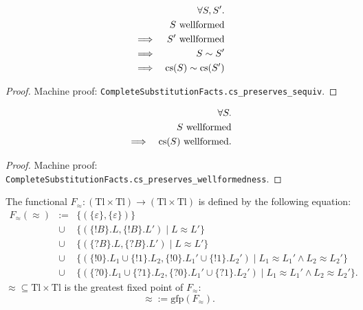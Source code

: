 \documentclass{llncs}
\newcommand*{\Tl}{\mathrm{Tl}}
\newcommand*{\gfp}{\mathrm{gfp}}
\newcommand*{\bisim}{\approx}
\newcommand*{\cs}{\mathrm{cs}}
\newcommand*{\sequiv}{\sim}
\newcommand*{\send}{\mathord{!}}
\newcommand*{\recv}{\mathord{?}}
\newcommand*{\wf}[1]{\text{$#1$ {\normalfont \rmfamily wellformed}}}
\renewcommand*{\|}{\;|\;}
\renewcommand*{\epsilon}{\varepsilon}
\newcommand*{\machproofc}[1]{Machine proof: \code{#1}.}
\newcommand*{\code}[1]{\texttt{#1}}
\begin{document}
\begin{lemma}
  \label{lemma:cs_preserves_sequiv}
  \begin{eqnarray*}
    &&         \forall S, S'. \\
    &&         \wf{S} \\
    &\implies& \wf{S'} \\
    &\implies& S \sequiv S' \\
    &\implies& \cs(S) \sequiv \cs(S')
  \end{eqnarray*}
\end{lemma}

\begin{proof}
  \machproofc{CompleteSubstitutionFacts.cs\_preserves\_sequiv}
\end{proof}


\begin{lemma}
  \label{lemma:cs_preserves_wellformedness}
  \begin{eqnarray*}
    &&         \forall S. \\
    &&         \wf{S} \\
    &\implies& \wf{\cs(S)}.
  \end{eqnarray*}
\end{lemma}

\begin{proof}
  \machproofc{CompleteSubstitutionFacts.cs\_preserves\_wellformedness}
\end{proof}


\begin{definition}
  \label{def:tl_bisim}
  The functional $F_\bisim\colon (\Tl \times \Tl) \to (\Tl \times \Tl)$ is
  defined by the following equation:
  \begin{eqnarray*}
    F_\bisim(\bisim)
    &:=&   \{ (\{\epsilon\}, \{\epsilon\})\} \\
    &\cup& \{ (\{\send B\}.L, \{\send B\}.L') \mid L \bisim L' \} \\
    &\cup& \{ (\{\recv B\}.L, \{\recv B\}.L') \mid L \bisim L' \} \\
    &\cup& \{ (\{\send 0\}.L_1 \cup \{\send 1\}.L_2, \{\send 0\}.L_1' \cup \{\send 1\}.L_2')
              \mid L_1 \bisim L_1' \land L_2 \bisim L_2' \} \\
    &\cup& \{ (\{\recv 0\}.L_1 \cup \{\recv 1\}.L_2, \{\recv 0\}.L_1' \cup \{\recv 1\}.L_2')
              \mid L_1 \bisim L_1' \land L_2 \bisim L_2' \}.
  \end{eqnarray*}
  $\bisim \subseteq \Tl \times \Tl$ is the greatest fixed point of $F_\bisim$:
  \begin{equation*}
    \bisim := \gfp(F_\bisim).
  \end{equation*}
\end{definition}
\end{document}
